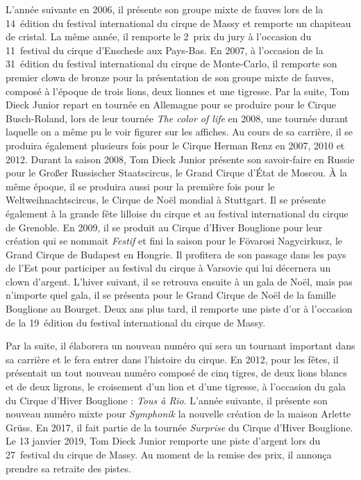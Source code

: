 L'année suivante en 2006, il présente son groupe mixte de fauves lors de la 14\ieme~édition du festival international du cirque de Massy et remporte un chapiteau de cristal. La même année, il remporte le 2\ieme~prix du jury à l'occasion du 11\ieme~festival du cirque d'Enschede aux Pays-Bas. En 2007, à l'occasion de la 31\ieme~édition du festival international du cirque de Monte-Carlo, il remporte son premier clown de bronze pour la présentation de son groupe mixte de fauves, composé à l'époque de trois lions, deux lionnes et une tigresse. Par la suite, Tom Dieck Junior repart en tournée en Allemagne pour se produire pour le Cirque Busch-Roland, lors de leur tournée \textit{The color of life} en 2008, une tournée durant laquelle on a même pu le voir figurer sur les affiches. Au cours de sa carrière, il se produira également plusieurs fois pour le Cirque Herman Renz en 2007, 2010 et 2012. Durant la saison 2008, Tom Dieck Junior présente son savoir-faire en Russie pour le Großer Russischer Staatscircus, le Grand Cirque d'État de Moscou. À la même époque, il se produira aussi pour la première fois pour le Weltweihnachtscircus, le Cirque de Noël mondial à Stuttgart. Il se présente également à la grande fête lilloise du cirque et au festival international du cirque de Grenoble. En 2009, il se produit au Cirque d'Hiver Bouglione pour leur création qui se nommait \textit{Festif} et fini la saison pour le Fövarosi Nagycirkusz, le Grand Cirque de Budapest en Hongrie. Il profitera de son passage dans les pays de l'Est pour participer au festival du cirque à Varsovie qui lui décernera un clown d'argent. L'hiver suivant, il se retrouva ensuite à un gala de Noël, mais pas n'importe quel gala, il se présenta pour le Grand Cirque de Noël de la famille Bouglione au Bourget. Deux ans plus tard, il remporte une piste d'or à l'occasion de la 19\ieme~édition du festival international du cirque de Massy.

Par la suite, il élaborera un nouveau numéro qui sera un tournant important dans sa carrière et le fera entrer dans l'histoire du cirque. En 2012, pour les fêtes, il présentait un tout nouveau numéro composé de cinq tigres, de deux lions blancs et de deux ligrons, le croisement d’un lion et d’une tigresse, à l'occasion du gala du Cirque d'Hiver Bouglione : \textit{Tous à Rio}. L'année suivante, il présente son nouveau numéro mixte pour \textit{Symphonik} la nouvelle création de la maison Arlette Grüss. En 2017, il fait partie de la tournée \textit{Surprise} du Cirque d'Hiver Bouglione. Le 13 janvier 2019, Tom Dieck Junior remporte une piste d’argent lors du 27\ieme~festival du cirque de Massy. Au moment de la remise des prix, il annonça prendre sa retraite des pistes.

